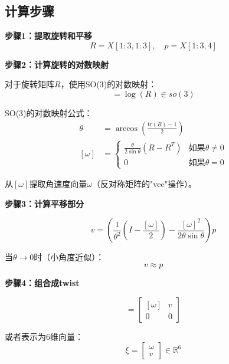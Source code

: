 \documentclass[12pt,a4paper]{article}
\begin{document}
\subsection{计算步骤}

\textbf{步骤1：提取旋转和平移}
\begin{equation}
R = X[1:3, 1:3], \quad p = X[1:3, 4]
\end{equation}

\textbf{步骤2：计算旋转的对数映射}

对于旋转矩阵$R$，使用SO(3)的对数映射：
\begin{equation}
[\omega] = \log(R) \in so(3)
\end{equation}

SO(3)的对数映射公式：
\begin{align}
\theta &= \arccos\left(\frac{\text{tr}(R) - 1}{2}\right) \\
[\omega] &= \begin{cases}
\frac{\theta}{2\sin\theta}(R - R^T) & \text{如果} \theta \neq 0 \\
0 & \text{如果} \theta = 0
\end{cases}
\end{align}

从$[\omega]$提取角速度向量$\omega$（反对称矩阵的"vee"操作）。

\textbf{步骤3：计算平移部分}

\begin{equation}
v = \left(\frac{1}{\theta^2}\left(I - \frac{[\omega]}{2}\right) - \frac{[\omega]^2}{2\theta\sin\theta}\right) p
\end{equation}

当$\theta \to 0$时（小角度近似）：
\begin{equation}
v \approx p
\end{equation}

\textbf{步骤4：组合成twist}

\begin{equation}
[\xi] = \begin{bmatrix}
[\omega] & v \\
0 & 0
\end{bmatrix}
\end{equation}

或者表示为6维向量：
\begin{equation}
\xi = \begin{bmatrix} \omega \\ v \end{bmatrix} \in \mathbb{R}^6
\end{equation}
\end{document}
